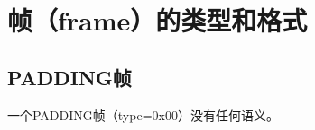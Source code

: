 \section{帧（frame）的类型和格式}
\subsection{PADDING帧}
\label{subsec:padding-frames}
一个PADDING帧（type=0x00）没有任何语义。